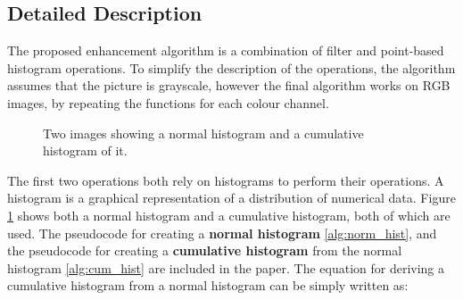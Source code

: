 \documentclass[journal,transmag]{IEEEtran}
\begin{document}
\subsection{Detailed Description}
The proposed enhancement algorithm is a combination of filter and point-based histogram operations. To simplify the description of the operations, the algorithm assumes that the picture is grayscale, however the final algorithm works on RGB images, by repeating the functions for each colour channel. 
\begin{figure}[t] %
	\centering
	\caption{Two images showing a normal histogram and a cumulative histogram of it.}
	\label{fig:hist_comp}
\end{figure}
The first two operations both rely on histograms to perform their operations. A histogram is a graphical representation of a distribution of numerical data\cite{histDesc}\cite{histDescWiki}. Figure \ref{fig:hist_comp} shows both a normal histogram and a cumulative histogram, both of which are used. The pseudocode for creating a \textbf{normal histogram} \ref{alg:norm_hist}, and the pseudocode for creating a \textbf{cumulative histogram} from the normal histogram \ref{alg:cum_hist} are included in the paper. The equation for deriving a cumulative histogram from a normal histogram can be simply written as: 
\end{document}
